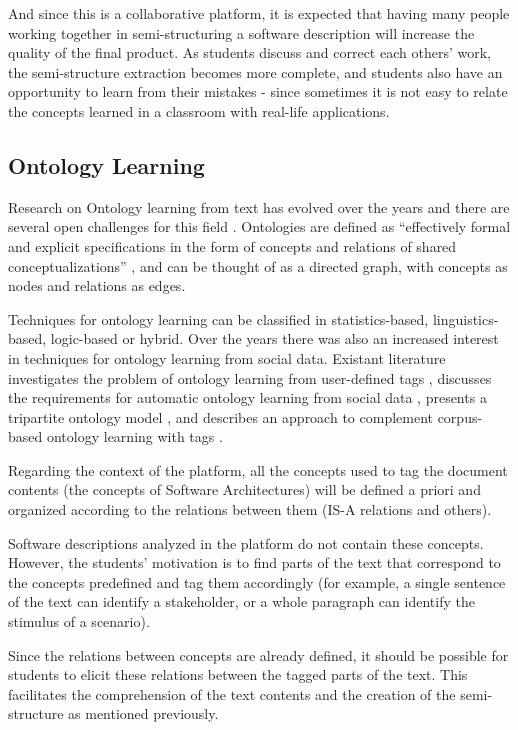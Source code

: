 \documentclass{llncs}
\begin{document}
And since this is a collaborative platform, it is expected that having many people working together in semi-structuring a software description will increase the quality of the final product. 
As students discuss and correct each others' work, the semi-structure extraction becomes more complete, and students also have an opportunity to learn from their mistakes - since sometimes it is not easy to relate the concepts learned in a classroom with real-life applications.


	
\subsection{Ontology Learning}
Research on Ontology learning from text has evolved over the years and there are several open challenges for this field \cite{wong2012ontology}. Ontologies are defined as ``effectively formal and explicit specifications in the form of concepts and relations of shared conceptualizations'' \cite{gruber1993translation}, and can be thought of as a directed graph, with concepts as nodes and relations as edges.
 
Techniques for ontology learning can be classified in statistics-based, linguistics-based, logic-based or hybrid. Over the years there was also an increased interest in techniques for ontology learning from social data. Existant literature investigates the problem of ontology learning from user-defined tags \cite{tang2009towards}, discusses the requirements for automatic ontology learning from social data \cite{kotis2011automated}, presents a tripartite ontology model \cite{mika2007ontologies}, and describes an approach to complement corpus-based ontology learning with tags \cite{weichselbraun2010augmenting}.

Regarding the context of the platform, all the concepts used to tag the document contents (the concepts of Software Architectures) will be defined a priori and organized according to the relations between them (IS-A relations and others).

Software descriptions analyzed in the platform do not contain these concepts. However, the students' motivation is to find parts of the text that correspond to the concepts predefined and tag them accordingly (for example, a single sentence of the text can identify a stakeholder, or a whole paragraph can identify the stimulus of a scenario). 

Since the relations between concepts are already defined, it should be possible for students to elicit these relations between the tagged parts of the text. This facilitates the comprehension of the text contents and the creation of the semi-structure as mentioned previously.
\end{document}

